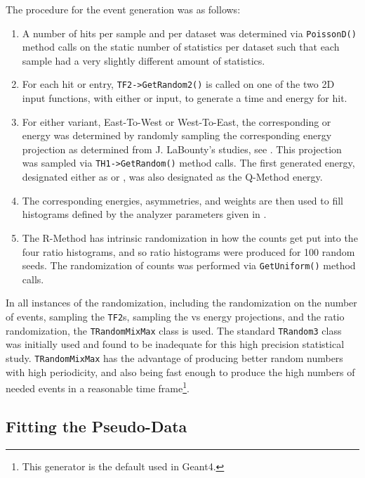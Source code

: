 The procedure for the event generation was as follows:
\begin{enumerate}
	\item{A number of hits per sample and per dataset was determined via \texttt{PoissonD()} method calls on the static number of statistics per dataset such that each sample had a very slightly different amount of statistics.} 
	\item{For each hit or entry, \texttt{TF2->GetRandom2()} is called on one of the two 2D input functions, with either \RE or \RW input, to generate a time and energy for hit.}
	\item{For either variant, East-To-West or West-To-East, the corresponding \RW or \RE energy was determined by randomly sampling the corresponding energy projection as determined from J. LaBounty's studies, see . This projection was sampled via \texttt{TH1->GetRandom()} method calls. The first generated energy, designated either as \RE or \RW, was also designated as the Q-Method energy.}
	\item{The corresponding energies, asymmetries, and weights are then used to fill histograms defined by the analyzer parameters given in .}
	\item{The R-Method has intrinsic randomization in how the counts get put into the four ratio histograms, and so ratio histograms were produced for 100 random seeds. The randomization of counts was performed via \texttt{GetUniform()} method calls.}
\end{enumerate}


In all instances of the randomization, including the randomization on the number of events, sampling the \texttt{TF2}s, sampling the \RE vs \RW energy projections, and the ratio randomization, the \ROOT\texttt{TRandomMixMax} class is used. The standard \texttt{TRandom3} class was initially used and found to be inadequate for this high precision statistical study. \texttt{TRandomMixMax} has the advantage of producing better random numbers with high periodicity, and also being fast enough to produce the high numbers of needed events in a reasonable time frame\footnote{This generator is the default used in Geant4.}\cite{TRandom}.






\subsection{Fitting the Pseudo-Data}


